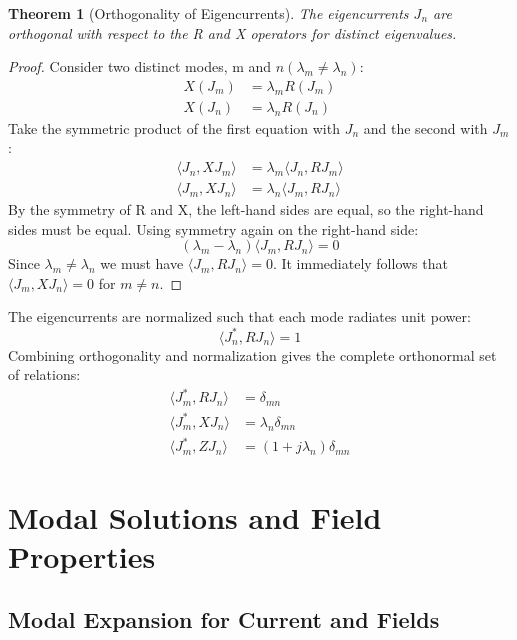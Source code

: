 \documentclass[11pt,a4paper]{article}
\newcommand{\avg}[1]{\langle #1 \rangle} %
\newtheorem{theorem}{Theorem}[section]
\begin{document}
\begin{theorem}[Orthogonality of Eigencurrents]
The eigencurrents \(J_{n}\) are orthogonal with respect to the R and X operators for distinct eigenvalues.
\end{theorem}
\begin{proof}
Consider two distinct modes, m and \(n (\lambda_{m}\ne\lambda_{n})\):
\begin{align}
    X(J_{m}) &= \lambda_{m}R(J_{m}) \\
    X(J_{n}) &= \lambda_{n}R(J_{n})
\end{align}
Take the symmetric product of the first equation with \(J_{n}\) and the second with \(J_{m}\):
\begin{align}
    \avg{ J_{n},XJ_{m}} &= \lambda_{m}\avg{ J_{n},RJ_{m}} \\
    \avg{ J_{m},XJ_{n}} &= \lambda_{n}\avg{ J_{m},RJ_{n}}
\end{align}
By the symmetry of R and X, the left-hand sides are equal, so the right-hand sides must be equal. Using symmetry again on the right-hand side:
\begin{equation}
    (\lambda_{m}-\lambda_{n})\avg{ J_{m},RJ_{n}}=0
\end{equation}
Since \(\lambda_{m}\ne\lambda_{n}\) we must have \(\avg{ J_{m},RJ_{n}}=0\). It immediately follows that \(\avg{ J_{m},XJ_{n}}=0\) for \(m\ne n\).
\end{proof}

The eigencurrents are normalized such that each mode radiates unit power:
\begin{equation}
    \avg{ J_{n}^{*},RJ_{n}}=1
\end{equation}
Combining orthogonality and normalization gives the complete orthonormal set of relations:
\begin{align}
    \avg{ J_{m}^{*},RJ_{n}} &= \delta_{mn} \\
    \avg{ J_{m}^{*},XJ_{n}} &= \lambda_{n}\delta_{mn} \\
    \avg{ J_{m}^{*},ZJ_{n}} &= (1+j\lambda_{n})\delta_{mn}
\end{align}

\section{Modal Solutions and Field Properties}
\subsection{Modal Expansion for Current and Fields}
\end{document}
